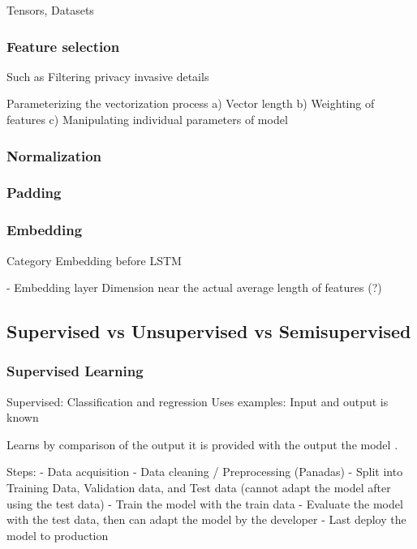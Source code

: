 Tensors, Datasets

\subsubsection{Feature selection}
Such as Filtering privacy invasive details

Parameterizing the vectorization process
a) Vector length
b) Weighting of features
c) Manipulating individual parameters of model

\subsubsection{Normalization}



\subsubsection{Padding}

\subsubsection{Embedding}

Category Embedding before LSTM


- Embedding layer
Dimension near the actual average length of features (?)

\subsection{Supervised vs Unsupervised vs Semisupervised}

\subsubsection{Supervised Learning}
Supervised: Classification and regression
Uses  examples: Input and output is known

Learns by comparison of the output it is provided with the output the model .

Steps:
- Data acquisition
- Data cleaning / Preprocessing (Panadas)
- Split into Training Data, Validation data, and Test data (cannot adapt the model after using the test data)
- Train the model with the train data
- Evaluate the model with the test data, then can adapt the model by the developer
- Last deploy the model to production

